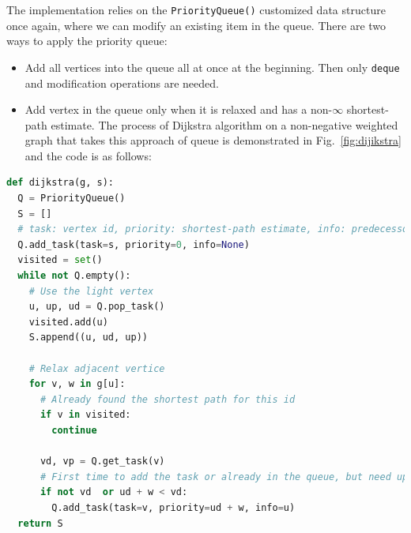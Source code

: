 \documentclass[../main.tex]{subfiles}
\begin{document}
The implementation relies on the \texttt{PriorityQueue()} customized data structure once again, where we can modify an existing item in the queue. There are two ways to apply the priority queue:
\begin{itemize}
    \item Add all vertices into the queue all at once at the beginning. Then only \texttt{deque} and modification operations are needed. 
    \item Add vertex in the queue only when it is relaxed and has a non-$\infty$ shortest-path estimate. The process of Dijkstra algorithm on a non-negative weighted graph that takes this approach of queue is demonstrated  in Fig.~\ref{fig:dijikstra} and the code is as follows:
\end{itemize}
\begin{lstlisting}[language=Python]
def dijkstra(g, s):
  Q = PriorityQueue()
  S = []
  # task: vertex id, priority: shortest-path estimate, info: predecessor
  Q.add_task(task=s, priority=0, info=None)
  visited = set()
  while not Q.empty():
    # Use the light vertex
    u, up, ud = Q.pop_task()
    visited.add(u)
    S.append((u, ud, up))

    # Relax adjacent vertice
    for v, w in g[u]: 
      # Already found the shortest path for this id
      if v in visited: 
        continue
      
      vd, vp = Q.get_task(v)
      # First time to add the task or already in the queue, but need update 
      if not vd  or ud + w < vd:
        Q.add_task(task=v, priority=ud + w, info=u)
  return S
\end{lstlisting}
\end{document}
